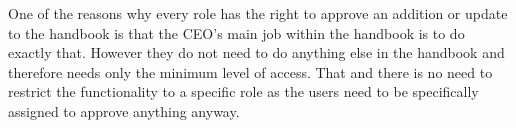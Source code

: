 One of the reasons why every role has the right to approve an addition or update to the handbook is that the CEO's main job within the handbook is to do exactly that.
However they do not need to do anything else in the handbook and therefore needs only the minimum level of access.
That and there is no need to restrict the functionality to a specific role as the users need to be specifically assigned to approve anything anyway.
